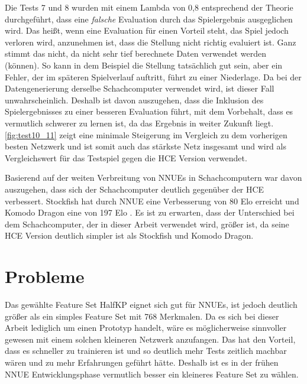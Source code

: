 Die Tests 7 und 8 wurden mit einem Lambda von 0,8 entsprechend der Theorie durchgeführt, dass eine \emph{falsche} Evaluation durch das Spielergebnis ausgeglichen wird. Das heißt, wenn eine Evaluation für einen Vorteil steht, das Spiel jedoch verloren wird, anzunehmen ist, dass die Stellung nicht richtig evaluiert ist. Ganz stimmt das nicht, da nicht sehr tief berechnete Daten verwendet werden (können). So kann in dem Beispiel die Stellung tatsächlich gut sein, aber ein Fehler, der im späteren Spielverlauf auftritt, führt zu einer Niederlage. Da bei der Datengenerierung derselbe Schachcomputer verwendet wird, ist dieser Fall unwahrscheinlich. Deshalb ist davon auszugehen, dass die Inklusion des Spielergebnisses zu einer besseren Evaluation führt, mit dem Vorbehalt, dass es vermutlich schwerer zu lernen ist, da das Ergebnis in weiter Zukunft liegt. \autoref{fig:test10_11} zeigt eine minimale Steigerung im Vergleich zu dem vorherigen besten Netzwerk und ist somit auch das stärkste Netz insgesamt und wird als Vergleichswert für das Testspiel gegen die \ac{HCE} Version verwendet.

Basierend auf der weiten Verbreitung von \acp{NNUE} in Schachcomputern war davon auszugehen, dass sich der Schachcomputer deutlich gegenüber der \ac{HCE} verbessert. Stockfish hat durch \ac{NNUE} eine Verbesserung von 80 Elo erreicht und Komodo Dragon eine von 197 Elo \cite{StockfishIntroducingNNUE, KomodoDragon}. Es ist zu erwarten, dass der Unterschied bei dem Schachcomputer, der in dieser Arbeit verwendet wird, größer ist, da seine \ac{HCE} Version deutlich simpler ist als Stockfish und Komodo Dragon.

\section{Probleme}

Das gewählte Feature Set HalfKP eignet sich gut für \acp{NNUE}, ist jedoch deutlich größer als ein simples Feature Set mit 768 Merkmalen. Da es sich bei dieser Arbeit lediglich um einen Prototyp handelt, wäre es möglicherweise sinnvoller gewesen mit einem solchen kleineren Netzwerk anzufangen. Das hat den Vorteil, dass es schneller zu trainieren ist und so deutlich mehr Tests zeitlich machbar wären und zu mehr Erfahrungen geführt hätte. Deshalb ist es in der frühen \ac{NNUE} Entwicklungsphase vermutlich besser ein kleineres Feature Set zu wählen.

